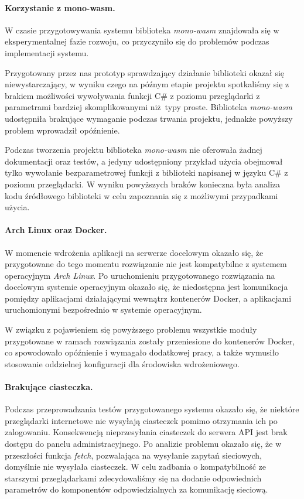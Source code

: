 \documentclass[a4paper,11pt,twoside]{report}
\theoremstyle{definition}
\begin{document}
        \paragraph{Korzystanie z mono-wasm.}     
            W czasie przygotowywania systemu biblioteka \textit{mono-wasm} znajdowała się w eksperymentalnej fazie rozwoju, co przyczyniło się do problemów podczas implementacji systemu.
            
            Przygotowany przez nas prototyp sprawdzający działanie biblioteki okazał się niewystarczający, w wyniku czego na późnym etapie projektu spotkaliśmy się z brakiem możliwości wywoływania funkcji C\# z poziomu przeglądarki z parametrami bardziej skomplikowanymi niż typy proste. Biblioteka \textit{mono-wasm} udostępniła brakujące wymaganie podczas trwania projektu, jednakże powyższy problem wprowadził opóźnienie.
            
            Podczas tworzenia projektu biblioteka \textit{mono-wasm} nie oferowała żadnej dokumentacji oraz testów, a jedyny udostępniony przykład użycia obejmował tylko wywołanie bezparametrowej funkcji z biblioteki napisanej w języku C\# z poziomu przeglądarki. W wyniku powyższych braków konieczna była analiza kodu źródłowego biblioteki w celu zapoznania się z możliwymi przypadkami użycia.
        
        \paragraph{Arch Linux oraz Docker.}
            W momencie wdrożenia aplikacji na serwerze docelowym okazało się, że przygotowane do tego momentu rozwiązanie nie jest kompatybilne z systemem operacyjnym \textit{Arch Linux}. Po uruchomieniu przygotowanego rozwiązania na docelowym systemie operacyjnym okazało się, że niedostępna jest komunikacja pomiędzy aplikacjami działającymi wewnątrz kontenerów Docker, a aplikacjami uruchomionymi bezpośrednio w systemie operacyjnym.
            
            W związku z pojawieniem się powyższego problemu wszystkie moduły przygotowane w ramach rozwiązania zostały przeniesione do kontenerów Docker, co spowodowało opóźnienie i wymagało dodatkowej pracy, a także wymusiło stosowanie oddzielnej konfiguracji dla środowiska wdrożeniowego.
            
        \paragraph{Brakujące ciasteczka.}
            Podczas przeprowadzania testów przygotowanego systemu okazało się, że niektóre przeglądarki internetowe nie wysyłają ciasteczek pomimo otrzymania ich po zalogowaniu.
            Konsekwencją nieprzesyłania ciasteczek do serwera API jest brak dostępu do panelu administracyjnego. Po analizie problemu okazało się, że w przeszłości funkcja \textit{fetch}, pozwalająca na wysyłanie zapytań sieciowych, domyślnie nie wysyłała ciasteczek. W celu zadbania o kompatybilność ze starszymi przeglądarkami zdecydowaliśmy się na dodanie odpowiednich parametrów do komponentów odpowiedzialnych za komunikację sieciową.
    
\end{document}
